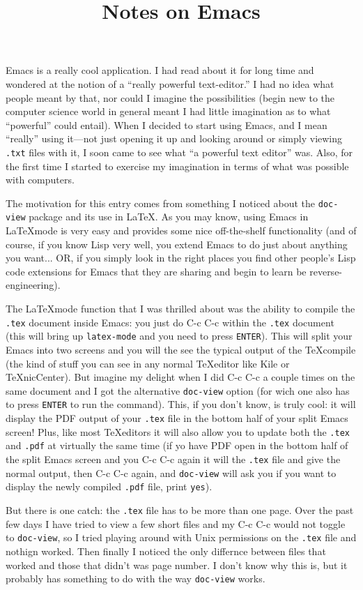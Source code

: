 \documentclass{wpblogentry}
\title{Notes on Emacs}
\begin{document}
Emacs is a really cool application. I had read about it for long time and wondered at the notion of a ``really powerful text-editor.'' I had no idea what people meant by that, nor could I imagine the possibilities (begin new to the computer science world in general meant I had little imagination as to what ``powerful'' could entail). When I decided to start using Emacs, and I mean ``really'' using it---not just opening it up and looking around or simply viewing \verb=.txt= files with it, I soon came to see what ``a powerful text editor'' was. Also, for the first time I started to exercise my imagination in terms of what was possible with computers.

The motivation for this entry comes from something I noticed about the \verb=doc-view= package and its use in \LaTeX. As you may know, using Emacs in \LaTeX mode is very easy and provides some nice off-the-shelf functionality (and of course, if you know Lisp very well, you extend Emacs to do just about anything you want... OR, if you simply look in the right places you find other people's Lisp code extensions for Emacs that they are sharing and begin to learn be reverse-engineering). 

The \LaTeX mode function that I was thrilled about was the ability to compile the \verb=.tex= document inside Emacs: you just do C-c C-c within the \verb=.tex= document (this will bring up \verb=latex-mode= and you need to press \verb=ENTER=). This will split your Emacs into two screens and you will the see the typical output of the \TeX compile (the kind of stuff you can see in any normal \TeX editor like Kile or TeXnicCenter). But imagine my delight when I did C-c C-c a couple times on the same document and I got the alternative \verb=doc-view= option (for wich one also has to press \verb=ENTER= to run the command). This, if you don't know, is truly cool: it will display the PDF output of your \verb=.tex= file in the bottom half of your split Emacs screen! Plus, like most \TeX editors it will also allow you to update both the \verb=.tex= and \verb=.pdf= at virtually the same time (if yo have PDF open in the bottom half of the split Emacs screen and you C-c C-c again it will the \verb=.tex= file and give the normal output, then C-c C-c again, and \verb=doc-view= will ask you if you want to display the newly compiled \verb=.pdf= file, print \verb=yes=).

But there is one catch: the \verb=.tex= file has to be more than one page. Over the past few days I have tried to view a few short files and my C-c C-c would not toggle to \verb=doc-view=, so I tried playing around with Unix permissions on the \verb=.tex= file and nothign worked. Then finally I noticed the only differnce between files that worked and those that didn't was page number. I don't know why this is, but it probably has something to do with the way \verb=doc-view= works. 
\end{document}
